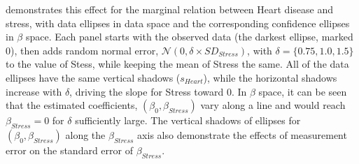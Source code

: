  demonstrates this effect for the marginal
relation between Heart disease and stress,
with data ellipses in data space and the corresponding confidence ellipses in $\beta$ space.
Each panel starts with the observed data (the darkest ellipse, marked $0$), then adds random normal error, 
$\mathcal{N}(0, \delta \times SD_{Stress})$, with $\delta = \{0.75, 1.0, 1.5\}$ to the value of Stess,
while keeping the mean of Stress the same.
All of the data ellipses have the same vertical shadows ($s_{Heart}$), while the horizontal shadows
increase with $\delta$, driving the slope for Stress toward 0.
In $\beta$ space, it can be seen that the estimated coefficients, $(\beta_0, \beta_{Stress})$
vary along a line and would reach $\beta_{Stress}=0$ for $\delta$ sufficiently large.
The vertical shadows of
ellipses for $(\beta_0, \beta_{Stress})$ along the $\beta_{Stress}$ axis
also demonstrate the effects of measurement error
on the standard error of $\beta_{Stress}$.



